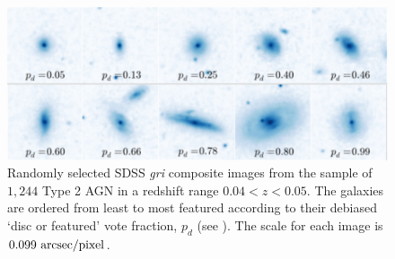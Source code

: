 \begin{figure}
\includegraphics[width=\textwidth]{agn/fig1.pdf}
\caption[SDSS images of galaxies in the \textsc{agn-host} sample]{Randomly selected SDSS \emph{gri} composite images from the sample of $1,244$ Type 2 AGN in a redshift range $0.04 < z < 0.05$.  The galaxies are ordered from least to most featured according to their debiased `disc or featured' vote fraction, $p_d$ (see \citealt{GZ2}). The scale for each image is $0.099~\rm{arcsec/pixel}$.}
\label{mosaic}
\end{figure}


